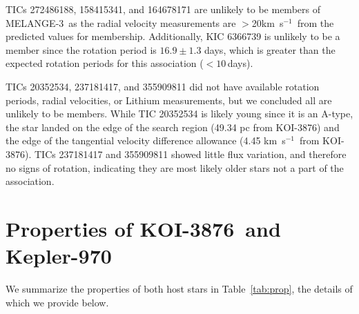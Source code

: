 \documentclass[twocolumn, linenumbers]{aastex631}
\newcommand{\association}{MELANGE-3}
\newcommand{\starname}{KOI-3876}
\newcommand{\starnametwo}{Kepler-970}
\newcommand\kms{km~s$^{-1}$}
\newcommand{\gaia}{\textit{Gaia}}
\begin{document}
TICs 272486188, 158415341, and 164678171 are unlikely to be members of \association\ as the radial velocity measurements are $>$20\kms\ from the predicted values for membership. Additionally, KIC 6366739 is unlikely to be a member since the rotation period is $16.9 \pm 1.3$ days, which is greater than the expected rotation periods for this association ($<10$\,days). 

TICs 20352534, 237181417, and 355909811 did not have available rotation periods, radial velocities, or Lithium measurements, but we concluded all are unlikely to be members. While TIC 20352534 is likely young since it is an A-type, the star landed on the edge of the search region (49.34 pc from \starname) and the edge of the tangential velocity difference allowance (4.45 \kms\ from \starname). TICs 237181417 and 355909811 showed little flux variation, and therefore no signs of rotation, indicating they are most likely older stars not a part of the association.\newline\newline 







\section{Properties of \starname\ and \starnametwo }\label{sec:stellar_params}

We summarize the properties of both host stars in Table~\ref{tab:prop}, the details of which we provide below.
\end{document}
